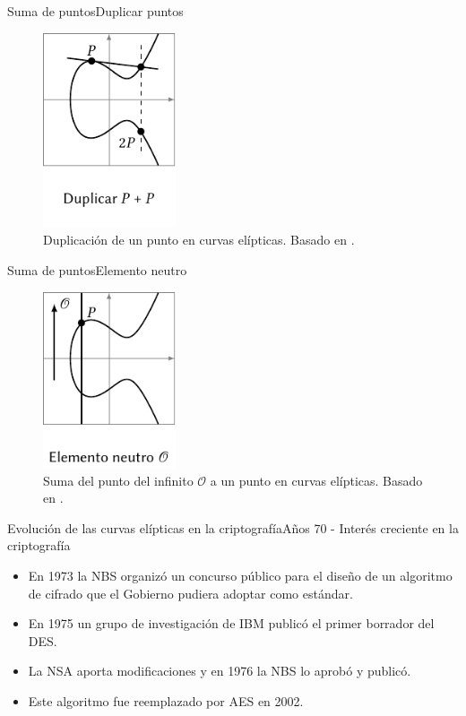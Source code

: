 \documentclass[spanish]{beamer}
\begin{document}
\begin{frame}{Suma de puntos}{Duplicar puntos}
  \begin{figure}[h]
    \centering
    \includegraphics[width=0.35\textwidth]{img/duplicar-curvas}
    \caption{Duplicación de un punto en curvas elípticas. Basado en  \parencite{eichlseder_elliptic_2016}.}
    \label{fig:duplicar-curvas}
  \end{figure}  
\end{frame}

\begin{frame}{Suma de puntos}{Elemento neutro}
  \begin{figure}[h]
    \centering
    \includegraphics[width=0.35\textwidth]{img/neutro-curvas}
    \caption{Suma del punto del infinito \(\mathcal O\) a un punto en curvas elípticas. Basado en  \parencite{eichlseder_elliptic_2016}.}
    \label{fig:duplicar-curvas}
  \end{figure}  
\end{frame}


\begin{frame}[fragile]{Evolución de las curvas elípticas en la criptografía}{Años 70 - Interés creciente en la criptografía}
  \begin{itemize}
    \item En 1973 la NBS organizó un concurso público para el diseño de un algoritmo de cifrado que el Gobierno pudiera adoptar como estándar.
    \item En 1975 un grupo de investigación de IBM publicó el primer borrador del DES.
    \item La NSA aporta modificaciones y en 1976 la NBS lo aprobó y publicó. %
    \item Este algoritmo fue reemplazado por AES en 2002.
  \end{itemize}
\end{frame}
\end{document}
